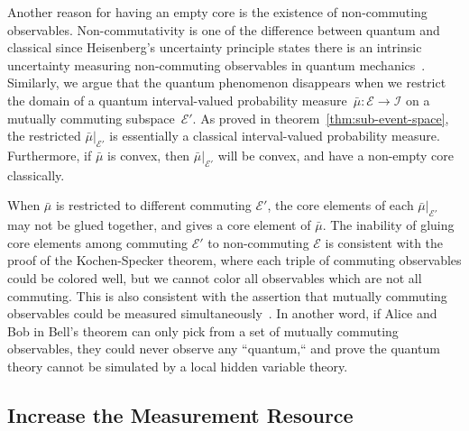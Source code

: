 \documentclass[12pt]{iopart}
\theoremstyle{plain}
\theoremstyle{definition}
\theoremstyle{remark}
\newcommand{\events}{\ensuremath{\mathcal{E}}}
\begin{document}
Another reason for having an empty core is the existence of non-commuting
observables. Non-commutativity is one of the difference between quantum
and classical since Heisenberg's uncertainty principle states there
is an intrinsic uncertainty measuring non-commuting observables in
quantum mechanics~\cite{Heisenberg1983,peres1995quantum,544199,Griffiths2003,Jaeger2007}.
Similarly, we argue that the quantum phenomenon disappears when we
restrict the domain of a quantum interval-valued probability measure~$\bar{\mu}:\events\rightarrow\mathscr{I}$
on a mutually commuting subspace~$\events'$. As proved in theorem~\ref{thm:sub-event-space},
the restricted $\bar{\mu}|_{\events'}$ is essentially a classical
interval-valued probability measure. Furthermore, if $\bar{\mu}$
is convex, then $\bar{\mu}|_{\events'}$ will be convex, and have
a non-empty core classically. 

When $\bar{\mu}$ is restricted to different commuting $\events'$,
the core elements of each $\bar{\mu}|_{\events'}$ may not be glued
together, and gives a core element of $\bar{\mu}$. The inability
of gluing core elements among commuting $\events'$ to non-commuting
$\events$ is consistent with the proof of the Kochen-Specker theorem,
where each triple of commuting observables could be colored well,
but we cannot color all observables which are not all commuting. This
is also consistent with the assertion that mutually commuting observables
could be measured simultaneously~\cite{Mermin_1993}. In another
word, if Alice and Bob in Bell's theorem can only pick from a set
of mutually commuting observables, they could never observe any ``quantum,``
and prove the quantum theory cannot be simulated by a local hidden
variable theory.

\subsection{Increase the Measurement Resource}
\end{document}
